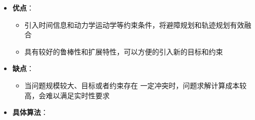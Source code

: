 \documentclass[../main.tex]{subfiles}
\begin{document}
\begin{enumerate}
\begin{itemize}
\begin{enumerate}
                    \item 建立\textbf{约束描述}，构建超图模型，进行最优化问题求解
                    \item 验证最优化得到的轨迹是否可行:
                        \begin{itemize}
                            \item 如果可行，计算速度控制变量$v$和$\omega$，驱动机器人执行；
                            \item 如果不可行，重新初始化，检查新的和改变的路径点，判断路径点密度是否能够确保视觉或者激光扫描传感器检测到，然后转步骤2迭代
                        \end{itemize}
                \end{enumerate}
            \item \textbf{优点}：
                \begin{itemize}
                    \item 引入时间信息和动力学运动学等约束条件，将避障规划和轨迹规划有效融合
                    \item 具有较好的鲁棒性和扩展特性，可以方便的引入新的目标和约束
                \end{itemize}
            \item \textbf{缺点}：
                \begin{itemize}
                    \item 当问题规模较大、目标或者约束存在 一定冲突时，问题求解计算成本较高，会难以满足实时性要求
                \end{itemize}
            \item \textbf{具体算法}：
                \small{}
\end{itemize}
\end{enumerate}
\end{document}
